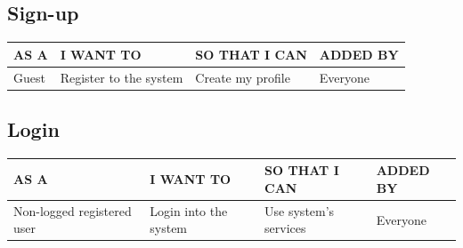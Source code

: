\documentclass[11pt, a4paper]{article}
\begin{document}
\subsection{Sign-up}
\begin{table}[h!]
    \centering
    \begin{tabular}{|p{4cm}|p{4cm}|p{4cm}|p{4cm}|}
    \hline
    \rowcolor[HTML]{EFEFEF} 
    AS A  & I WANT TO              & SO THAT I CAN     & ADDED BY \\ \hline
    Guest & Register to the system & Create my profile & Everyone \\ \hline
    \end{tabular}
\end{table}
\begin{figure}[h!]
    \centering
\end{figure}

\subsection{Login}
\begin{table}[h!]
    \centering
    \begin{tabular}{|p{4.5cm}|p{4cm}|p{4cm}|p{4cm}|}
    \hline
    \rowcolor[HTML]{EFEFEF} 
    AS A                       & I WANT TO             & SO THAT I CAN         & ADDED BY \\ \hline
    Non-logged registered user & Login into the system & Use system's services & Everyone \\ \hline
    \end{tabular}
\end{table}
\begin{figure}[h!]
    \centering
\end{figure}
\end{document}
